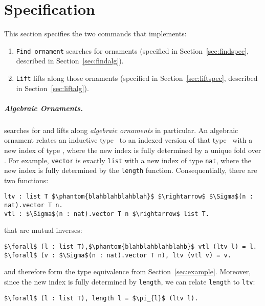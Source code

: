 \section{Specification}
\label{sec:spec}

This section specifies the two commands that \toolnameb implements:

\begin{enumerate}
\item \lstinline{Find ornament} searches for ornaments (specified in Section~\ref{sec:findspec}, described in Section~\ref{sec:findalg}).
\item \lstinline{Lift} lifts along those ornaments (specified in Section~\ref{sec:liftspec}, described in Section~\ref{sec:liftalg}). 
\end{enumerate}

\subparagraph*{Algebraic Ornaments.}
\toolnameb searches for and lifts along \textit{algebraic ornaments} in particular.
An algebraic ornament relates an inductive type \Aa\ to an indexed version of that type \B\ with a new index of type \IB,
where the new index is fully determined by a unique fold over \Aa. 
For example, \lstinline{vector} is exactly \lstinline{list} with a new index of type \lstinline{nat},
where the new index is fully determined by the \lstinline{length} function. Consequentially, there are two functions:
\begin{lstlisting}
ltv : list T $\phantom{blahblahblahblah}$ $\rightarrow$ $\Sigma$(n : nat).vector T n.
vtl : $\Sigma$(n : nat).vector T n $\rightarrow$ list T.
\end{lstlisting}
that are mutual inverses:
\begin{lstlisting}
$\forall$ (l : list T),$\phantom{blahblahblahblahb}$ vtl (ltv l) = l.
$\forall$ (v : $\Sigma$(n : nat).vector T n), ltv (vtl v) = v.
\end{lstlisting}
and therefore form the type equivalence from Section~\ref{sec:example}.
Moreover, since the new index is fully determined by \lstinline{length}, we can relate \lstinline{length} to \lstinline{ltv}:
\begin{lstlisting}
$\forall$ (l : list T), length l = $\pi_{l}$ (ltv l).
\end{lstlisting}

